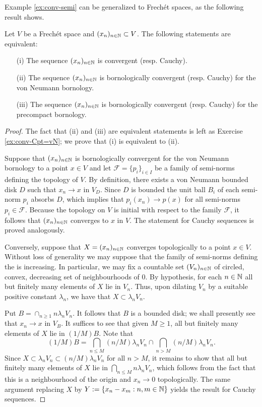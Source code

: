 Example \ref{ex:conv-semi} can be 
generalized to Frechét spaces, as the following result shows.

\begin{theorem} \label{thm:frechet-convergence}
Let $V$ be a Frechét space and $(x_n)_{n \in \mathbb N} \subset V$.
The following statements are equivalent:
\begin{itemize}
    \item[(i)] The sequence $(x_n)_{n \in \mathbb N}$ is convergent (resp. Cauchy).
    \item[(ii)] The sequence $(x_n)_{n \in \mathbb N}$ is bornologically convergent (resp. Cauchy)
    for the von Neumann bornology.
    \item[(iii)] The sequence $(x_n)_{n \in \mathbb N}$ is bornologically convergent (resp. Cauchy)
    for the precompact bornology.
\end{itemize}
\end{theorem}
\begin{proof} 
The fact that (ii) and (iii)
are equivalent statements
is left as Exercise \ref{ex:conv-Cpt=vN}; we prove that (i) 
is equivalent to (ii).

Suppose that $(x_n)_{n\in\mathbb N}$ 
is bornologically convergent for the von Neumann bornology to a point $x \in V$ and
let $\mathcal F = \{p_i\}_{i \in I}$ be a family of semi-norms defining the topology of $V$.
By definition, there exists a von Neumann bounded disk $D$ such that
$x_n \to x$ in $V_D$. Since $D$ is bounded 
the unit ball $B_i$ of each semi-norm $p_i$ 
absorbs $D$, which implies that $p_i(x_n) \to p(x)$ for all semi-norms $p_i \in \mathcal F$. 
Because the topology on $V$ is initial 
with respect to the family $\mathcal F$, 
it follows that $(x_n)_{n \in \mathbb N}$ 
converges to $x$ in $V$. The statement 
for Cauchy sequences is proved analogously.

Conversely, suppose that $X = (x_n)_{n \in \mathbb N}$ converges topologically to a point $x \in V$.
Without loss of generality we may suppose that the family of semi-norms 
defining the is increasing.
In particular, we may fix a countable set $(V_n)_{n\in\mathbb N}$ of 
circled, convex, decreasing set of neighbourhoods of $0$.
By hypothesis, for each $n \in \mathbb N$ all but finitely many elements of $X$
lie in $V_n$. Thus, upon dilating $V_n$ by a suitable positive constant $\lambda_n$,
we have that $X \subset \lambda_n V_n$.

Put $B = \cap_{n \ge 1} n\lambda_n V_n$. It follows that $B$ is a bounded disk; we shall presently 
see that $x_n \to x$ in $V_B$. It suffices to see that given $M \ge 1$,
all but finitely many elements of $X$ lie in $(1/M)B$. Note that
\[
(1/M)B
= \bigcap_{n \le M} (n/M) \lambda_n V_n 
\cap \bigcap_{n > M} (n/M) \lambda_n V_n.
\]
Since $X \subset \lambda_n V_n \subset (n/M)  \lambda_n V_n$ for all $n > M$, it remains 
to show that all but finitely many elements of $X$ lie in $\bigcap_{n \le M} n\lambda_n V_n$, which follows from the fact that this is a neighbourhood of
the origin and $x_n\to 0$ topologically.
The same argument replacing $X$ by
$Y := \{x_n-x_m : n,m \in\mathbb N\}$ yields the result for Cauchy sequences.
\end{proof}


